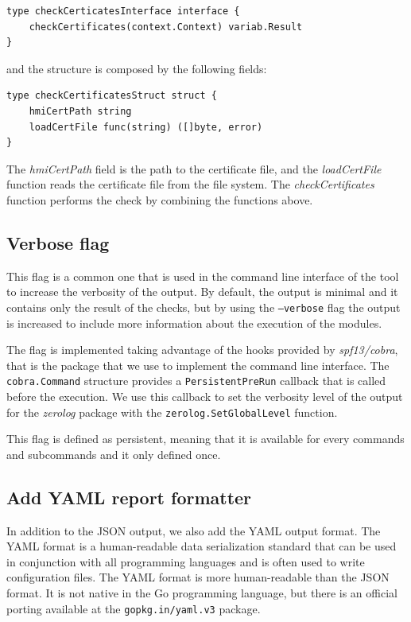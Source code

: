 \begin{lstlisting}[style=golang]
type checkCerticatesInterface interface {
	checkCertificates(context.Context) variab.Result
}
\end{lstlisting}

and the structure is composed by the following fields:

\begin{lstlisting}[style=golang]
type checkCertificatesStruct struct {
	hmiCertPath string
	loadCertFile func(string) ([]byte, error)
}
\end{lstlisting}

The \textit{hmiCertPath} field is the path to the certificate file, and the \textit{loadCertFile} function reads the certificate file from the file system. The \textit{checkCertificates} function performs the check by combining the functions above.

\subsection{Verbose flag}

This flag is a common one that is used in the command line interface of the tool to increase the verbosity of the output. By default, the output is minimal and it contains only the result of the checks, but by using the \texttt{--verbose} flag the output is increased to include more information about the execution of the modules.

The flag is implemented taking advantage of the hooks provided by \textit{spf13/cobra}, that is the package that we use to implement the command line interface. The \texttt{cobra.Command} structure provides a \texttt{PersistentPreRun} callback that is called before the execution. We use this callback to set the verbosity level of the output for the \textit{zerolog} package with the \texttt{zerolog.SetGlobalLevel} function.

This flag is defined as persistent, meaning that it is available for every commands and subcommands and it only defined once.

\subsection{Add YAML report formatter}

In addition to the JSON output, we also add the YAML output format. The YAML format is a human-readable data serialization standard that can be used in conjunction with all programming languages and is often used to write configuration files. The YAML format is more human-readable than the JSON format. It is not native in the Go programming language, but there is an official porting available at the \texttt{gopkg.in/yaml.v3} package.

